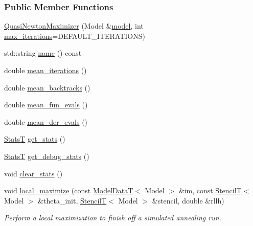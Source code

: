 \subsubsection*{Public Member Functions}
\begin{DoxyCompactItemize}
\item 
\hyperlink{classmappel_1_1QuasiNewtonMaximizer_ac24e592534b2022feab101f00b7385df}{Quasi\+Newton\+Maximizer} (Model \&\hyperlink{classmappel_1_1Estimator_a8322546d87ccdf01f8b0dcd9dae509f0}{model}, int \hyperlink{classmappel_1_1IterativeMaximizer_ac888935f332b069836a559f44cd267c7}{max\+\_\+iterations}=D\+E\+F\+A\+U\+L\+T\+\_\+\+I\+T\+E\+R\+A\+T\+I\+O\+NS)
\item 
std\+::string \hyperlink{classmappel_1_1QuasiNewtonMaximizer_ae73faf020acbbe1fbf3743ebf8860a38}{name} () const 
\item 
double \hyperlink{classmappel_1_1IterativeMaximizer_ae280c757d1b614dafe87200c7ed8681a}{mean\+\_\+iterations} ()
\item 
double \hyperlink{classmappel_1_1IterativeMaximizer_aac69dd736d791e2ee10cc0fa40454ee5}{mean\+\_\+backtracks} ()
\item 
double \hyperlink{classmappel_1_1IterativeMaximizer_ad66c3997d62ee2261637482f68906ef9}{mean\+\_\+fun\+\_\+evals} ()
\item 
double \hyperlink{classmappel_1_1IterativeMaximizer_ac852178ec09b7253b5b63f5300bf77a2}{mean\+\_\+der\+\_\+evals} ()
\item 
\hyperlink{namespacemappel_a04ab395b0cf82c4ce68a36b2212649a5}{StatsT} \hyperlink{classmappel_1_1IterativeMaximizer_a22783dc49fb4fd6e754b0d0ee161c543}{get\+\_\+stats} ()
\item 
\hyperlink{namespacemappel_a04ab395b0cf82c4ce68a36b2212649a5}{StatsT} \hyperlink{classmappel_1_1IterativeMaximizer_a1d9c29b69f468200a90bcd68adfb5643}{get\+\_\+debug\+\_\+stats} ()
\item 
void \hyperlink{classmappel_1_1IterativeMaximizer_af709331a98863a0d8a4003047f2b70a2}{clear\+\_\+stats} ()
\item 
void \hyperlink{classmappel_1_1IterativeMaximizer_a452cb0415d5b30de4176fcb63bf4c58b}{local\+\_\+maximize} (const \hyperlink{namespacemappel_a97f050df953605381ae9c901c3b125f1}{Model\+DataT}$<$ Model $>$ \&im, const \hyperlink{namespacemappel_a3a06598240007876f8c4bf834ad86197}{StencilT}$<$ Model $>$ \&theta\+\_\+init, \hyperlink{namespacemappel_a3a06598240007876f8c4bf834ad86197}{StencilT}$<$ Model $>$ \&stencil, double \&rllh)
\begin{DoxyCompactList}\small\item\em Perform a local maximization to finish off a simulated annealing run. \end{DoxyCompactList}\item 

\end{DoxyCompactItemize}
